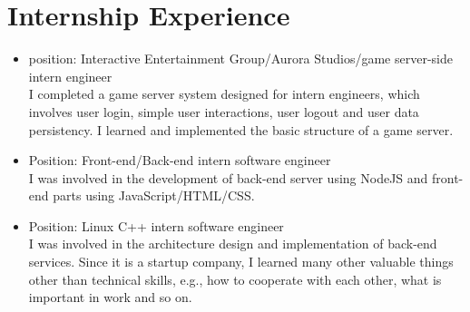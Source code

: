 \documentclass[11pt,a4paper]{moderncv}
\begin{document}


\section{Internship Experience}

{
\begin{itemize}
\item position: Interactive Entertainment Group/Aurora Studios/game server-side intern engineer\\
    I completed a game server system designed for intern engineers, which involves user login, simple user interactions, user logout and user data persistency. I learned and implemented the basic structure of a game server.
\end{itemize}
}


{
\begin{itemize}
\item Position: Front-end/Back-end intern software engineer\\
I was involved in the development of back-end server using NodeJS and front-end parts using JavaScript/HTML/CSS.
\end{itemize}
}

{
\begin{itemize}
\item Position: Linux C++ intern software engineer\\
I was involved in the architecture design and implementation of back-end services. Since it is a startup company, I learned many other valuable things other than technical skills, e.g., how to cooperate with each other, what is important in work and so on.
\end{itemize}
}
\end{document}
